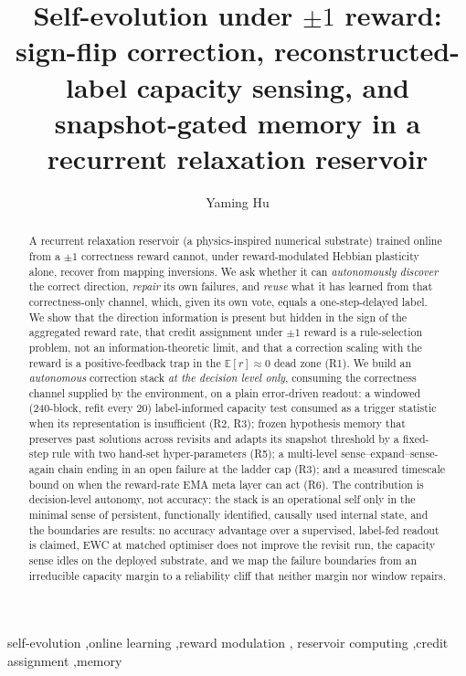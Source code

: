 \documentclass[preprint,12pt]{elsarticle}
\begin{document}
\begin{frontmatter}

\title{Self-evolution under $\pm1$ reward: sign-flip correction, reconstructed-label
capacity sensing, and snapshot-gated memory in a recurrent
relaxation reservoir}

\author{Yaming Hu}
\address{Guiyang, Guizhou 550000, China}

\begin{abstract}
A recurrent relaxation reservoir (a physics-inspired numerical substrate)
trained online from a $\pm1$ correctness reward cannot, under
reward-modulated Hebbian plasticity alone, recover from mapping inversions. We
ask whether it can \emph{autonomously discover} the correct direction,
\emph{repair} its own failures, and \emph{reuse} what it has learned from that
correctness-only channel, which, given its own vote, equals a
one-step-delayed label. We show that the direction information is present but
hidden in the sign of the aggregated reward rate, that credit assignment under
$\pm1$ reward is a rule-selection problem, not an information-theoretic
limit, and that a correction scaling with the reward is a
positive-feedback trap in the $\mathbb E[r]\approx0$ dead zone (R1). We build
an \emph{autonomous} correction stack \emph{at the decision level only},
consuming the correctness channel supplied by the environment, on a plain
error-driven readout: a windowed (240-block, refit every 20) label-informed
capacity test consumed as a trigger statistic when its representation is
insufficient (R2, R3); frozen hypothesis memory that
preserves past solutions across revisits and adapts its snapshot threshold
by a fixed-step rule with two hand-set hyper-parameters
(R5); a multi-level sense--expand--sense-again chain ending in
an open failure at the ladder cap (R3); and a measured timescale bound on when the
reward-rate EMA meta layer can act (R6). The
contribution is decision-level autonomy, not accuracy: the stack is an
operational self only in the minimal sense of persistent, functionally
identified, causally used internal state, and the boundaries are results: no accuracy advantage over a supervised,
label-fed readout is claimed, EWC at matched optimiser does not improve the
revisit run, the capacity sense idles on the deployed substrate, and we map the
failure boundaries from an irreducible capacity margin to a reliability cliff
that neither margin nor window repairs.
\end{abstract}

\begin{keyword}
self-evolution \sep online learning \sep reward modulation \sep
reservoir computing \sep credit assignment \sep memory
\end{keyword}

\end{frontmatter}
\end{document}
